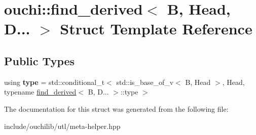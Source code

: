 \hypertarget{structouchi_1_1find__derived_3_01_b_00_01_head_00_01_d_8_8_8_01_4}{}\section{ouchi\+::find\+\_\+derived$<$ B, Head, D... $>$ Struct Template Reference}
\label{structouchi_1_1find__derived_3_01_b_00_01_head_00_01_d_8_8_8_01_4}
\subsection*{Public Types}
\begin{DoxyCompactItemize}
\item 
\mbox{\label{structouchi_1_1find__derived_3_01_b_00_01_head_00_01_d_8_8_8_01_4_a2414bb49fe5435ee7e12dee0348d600b}} 
using {\bfseries type} = std\+::conditional\+\_\+t$<$ std\+::is\+\_\+base\+\_\+of\+\_\+v$<$ B, Head $>$, Head, typename \mbox{\hyperlink{structouchi_1_1find__derived}{find\+\_\+derived}}$<$ B, D... $>$\+::type $>$
\end{DoxyCompactItemize}


The documentation for this struct was generated from the following file\+:\begin{DoxyCompactItemize}
\item 
include/ouchilib/utl/meta-\/helper.\+hpp\end{DoxyCompactItemize}
